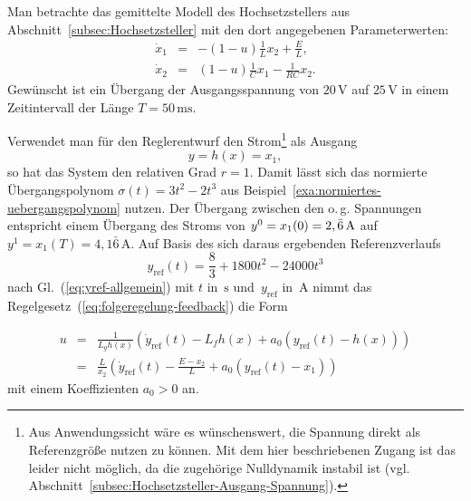 \begin{example}
\label{exa:hochsetzsteller-folgeregelung-feedback}Man betrachte das
gemittelte Modell des Hochsetzstellers aus
Abschnitt~\ref{subsec:Hochsetzsteller} mit den dort angegebenen
Parameterwerten:
\begin{equation}
\begin{array}{lcl}
\dot{x}_{1} & = & -(1-u)\frac{1}{L}x_{2}+\frac{E}{L},\\
\dot{x}_{2} & = & (1-u)\frac{1}{C}x_{1}-\frac{1}{RC}x_{2}.
\end{array}\label{eq:var-hochsetzsteller}
\end{equation}
Gewünscht ist ein Übergang der Ausgangsspannung von $20\,\text{V}$
auf $25\,\text{V}$ in einem Zeitintervall der Länge $T=50\,\text{ms}$.

Verwendet man für den Reglerentwurf den Strom\footnote{Aus Anwendungssicht wäre es wünschenswert, die Spannung direkt als
Referenzgröße nutzen zu können. Mit dem hier beschriebenen Zugang
ist das leider nicht möglich, da die zugehörige Nulldynamik instabil
ist (vgl. Abschnitt~\ref{subsec:Hochsetzsteller-Ausgang-Spannung}).} als Ausgang
\begin{equation}
y=h(x)=x_{1},\label{eq:hochsetzsteller-ausgang-strom-tracking}
\end{equation}
so hat das System den relativen Grad $r=1$. Damit lässt sich das
normierte Übergangspolynom $\sigma(t)=3t^{2}-2t^{3}$ aus Beispiel~\ref{exa:normiertes-uebergangspolynom}
nutzen. Der Übergang zwischen den o.\,g. Spannungen entspricht einem
Übergang des Stroms von $y^{0}=x_{1}(0)=2,\bar{6}\,\text{\text{A}}$
auf $y^{1}=x_{1}(T)=4,1\bar{6}\,\text{A}$. Auf Basis des sich daraus
ergebenden Referenzverlaufs
\begin{equation}
y_{\text{ref}}(t)=\frac{8}{3}+1800t^{2}-24000t^{3}\label{eq:hochsetzsteller-yref-strom}
\end{equation}
nach Gl.~(\ref{eq:yref-allgemein}) mit $t$ in~$\text{s}$ und~$y_{\text{ref}}$
in~$\text{A}$ nimmt das Regelgesetz~(\ref{eq:folgeregelung-feedback})
die Form
\end{example}
\begin{eqnarray*}
u & = & \frac{1}{L_{g}h(x)}\left(\dot{y}_{\text{ref}}(t)-L_{f}h(x)+a_{0}(y_{\text{ref}}(t)-h(x))\right)\\
 & = & \frac{L}{x_{2}}\left(\dot{y}_{\text{ref}}(t)-\frac{E-x_{2}}{L}+a_{0}(y_{\text{ref}}(t)-x_{1})\right)
\end{eqnarray*}
mit einem Koeffizienten $a_{0}>0$ an.

